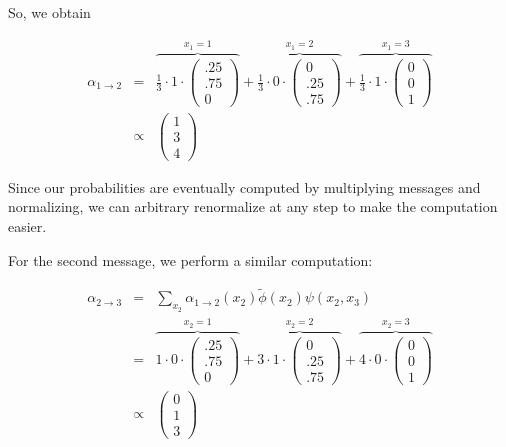 \documentclass[6008notes.tex]{subfiles}
\begin{document}
So, we obtain

\begin{eqnarray*}
		\alpha_{1 \to 2} &= &
		\overbrace{\frac{1}{3} \cdot 1 \cdot \begin{pmatrix} .25 \\ .75 \\ 0 \end{pmatrix}}^{x_1 = 1} +
		\overbrace{\frac{1}{3} \cdot 0 \cdot \begin{pmatrix} 0 \\ .25 \\ .75 \end{pmatrix}}^{x_1 = 2} +
		\overbrace{\frac{1}{3} \cdot 1 \cdot \begin{pmatrix} 0 \\ 0 \\ 1 \end{pmatrix}}^{x_1 = 3} \\
		&\propto& \begin{pmatrix} 1 \\ 3 \\ 4 \end{pmatrix}
\end{eqnarray*}
						
Since our probabilities are eventually computed by multiplying messages and normalizing, we can arbitrary renormalize at any step to make the computation easier.

For the second message, we perform a similar computation:

\begin{eqnarray*}
		\alpha_{2 \to 3} &= &
				\sum_{x_2} {\alpha_{1 \to 2}(x_2) \tilde{\phi}(x_2)} \psi(x_2,x_3) \\
		&= &
				\overbrace{1 \cdot 0 \cdot \begin{pmatrix} .25 \\ .75 \\ 0 \end{pmatrix}}^{x_2 = 1} +
				\overbrace{3 \cdot 1 \cdot \begin{pmatrix} 0 \\ .25 \\ .75 \end{pmatrix}}^{x_2 = 2} +
				\overbrace{4 \cdot 0 \cdot \begin{pmatrix} 0 \\ 0 \\ 1 \end{pmatrix}}^{x_2 = 3} \\
		&\propto& \begin{pmatrix} 0 \\ 1 \\ 3 \end{pmatrix}
\end{eqnarray*}
						
\end{document}
